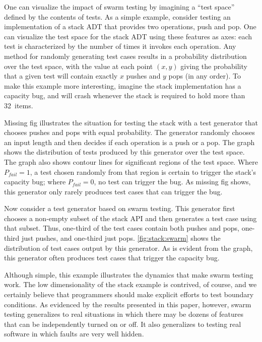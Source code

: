 One can visualize the impact of swarm testing by imagining a ``test
space'' defined by the contents of tests. As a simple example,
consider testing an implementation of a stack ADT that provides two
operations, push and pop. One can visualize the test space for the
stack ADT using these features as axes: each test is
characterized by the number of times it invokes each operation.
%
Any method for randomly generating test cases results in a probability
distribution over the test space, with the value at each point $(x,y)$ giving
the probability that a given test will contain exactly $x$ pushes and $y$ pops
(in any order).
%
To make this example more interesting, imagine the stack implementation has a
capacity bug, and will crash whenever the stack is required to hold
more than 32~items.


Missing fig illustrates the situation for testing the stack
with a test generator that chooses pushes and pops with equal probability.  The
generator randomly chooses an input length
and then decides if each operation is a push or a pop.  The graph shows the
distribution of tests produced by this generator over the test space.  The
graph also shows contour lines for significant regions of the test space.
Where $P_{fail}=1$, a test chosen randomly from that region is certain to
trigger the stack's capacity bug; where $P_{fail}=0$, no test can trigger the
bug.
%
As missing fig shows, this generator only rarely produces
test cases that can trigger the bug.


Now consider a test generator based on swarm testing. This generator
first chooses a non-empty subset of the stack API and then generates a
test case using that subset. 
%
Thus, one-third of the test cases contain both pushes and pops,
one-third just pushes, and one-third just pops.
%
\autoref{fig:stack:swarm} shows the distribution of test cases output by
this generator.  As is evident from the graph, this generator often produces
test cases that trigger the capacity bug.


Although simple, this example illustrates the dynamics that make
swarm testing work.
%
The low dimensionality of the stack example is contrived, of course, and we
certainly believe that programmers should make explicit efforts to test
boundary conditions.
%
As evidenced by the results presented in this paper, however, swarm testing
generalizes to real situations in which there may be dozens of features that
can be independently turned on or off.  It also generalizes to testing real
software in which faults are very well hidden.

